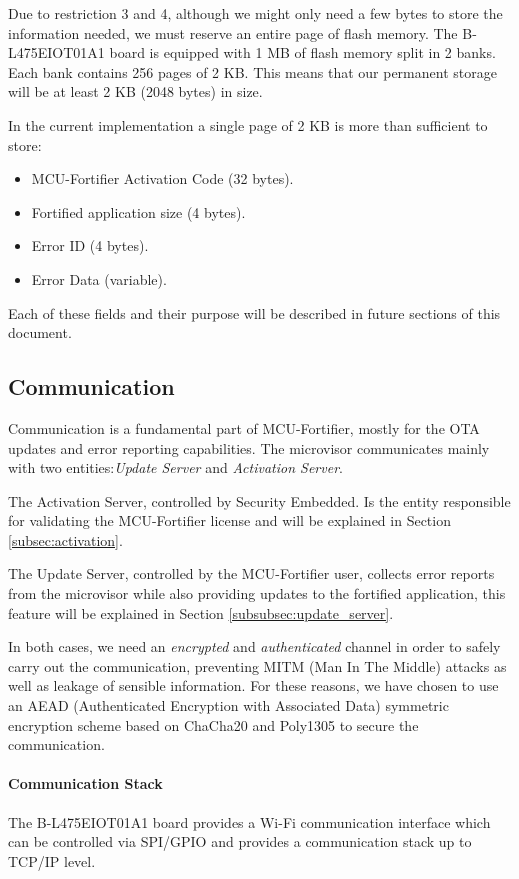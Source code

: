 \documentclass{article}
\begin{document}
Due to restriction 3 and 4, although we might only need a few bytes to store the information needed, we must reserve an entire page of flash memory. The B-L475EIOT01A1 board is equipped with 1 MB of flash memory split in 2 banks. Each bank contains 256 pages of 2 KB. This means that our permanent storage will be at least 2 KB (2048 bytes) in size.

In the current implementation a single page of 2 KB is more than sufficient to store:
\begin{itemize}
\item MCU-Fortifier Activation Code (32 bytes).
\item Fortified application size (4 bytes).
\item Error ID (4 bytes).
\item Error Data (variable).
\end{itemize}

Each of these fields and their purpose will be described in future sections of this document.

\subsection{Communication}
\label{subsec:comm}
Communication is a fundamental part of MCU-Fortifier, mostly for the OTA updates and error reporting capabilities. The microvisor communicates mainly with two entities:\textit{Update Server} and \textit{Activation Server}.

The Activation Server, controlled by Security Embedded. Is the entity responsible for validating the MCU-Fortifier license and will be explained in Section \ref{subsec:activation}.

The Update Server, controlled by the MCU-Fortifier user, collects error reports from the microvisor while also providing updates to the fortified application, this feature will be explained in Section \ref{subsubsec:update_server}.

In both cases, we need an \textit{encrypted} and \textit{authenticated} channel in order to safely carry out the communication, preventing MITM (Man In The Middle) attacks as well as leakage of sensible information.
For these reasons, we have chosen to use an AEAD (Authenticated Encryption with Associated Data) symmetric encryption scheme based on ChaCha20 and Poly1305 to secure the communication.

\paragraph{Communication Stack}
The B-L475EIOT01A1 board provides a Wi-Fi communication interface which can be controlled via SPI/GPIO and provides a communication stack up to TCP/IP level.
\end{document}
